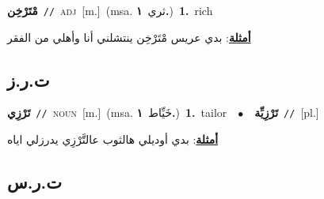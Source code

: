 \documentclass[10pt,a4paper,twoside]{article} %
\begin{document}
\begin{multicols}{2}
{{{{{\setlength\topsep{0pt}\textbf{\foreignlanguage{arabic}{مْتَرْخِن}}\ {\color{gray}\texttt{//}\color{black}}\ \textsc{adj}\ [m.]\ \color{gray}(msa. \foreignlanguage{arabic}{ثري}~\foreignlanguage{arabic}{\textbf{١.}})\color{black}\ \textbf{1.}~rich\  \begin{flushright}\color{gray}\foreignlanguage{arabic}{\textbf{\underline{\foreignlanguage{arabic}{أمثلة}}}: بدي عريس مْتَرْخِن ينتشلني أنا وأهلي من الفقر}\end{flushright}\color{black}} \vspace{2mm}

\vspace{-3mm}
\subsection*{\color{blue}\foreignlanguage{arabic}{ت.ر.ز}\color{blue}{}} 

{\setlength\topsep{0pt}\textbf{\foreignlanguage{arabic}{تَرْزِي}}\ {\color{gray}\texttt{//}\color{black}}\ \textsc{noun}\ [m.]\ \color{gray}(msa. \foreignlanguage{arabic}{خَيِّاط}~\foreignlanguage{arabic}{\textbf{١.}})\color{black}\ \textbf{1.}~tailor\ \ $\bullet$\ \ \setlength\topsep{0pt}\textbf{\foreignlanguage{arabic}{تَرْزِيِّة}}\ {\color{gray}\texttt{//}\color{black}}\ [pl.]\  \begin{flushright}\color{gray}\foreignlanguage{arabic}{\textbf{\underline{\foreignlanguage{arabic}{أمثلة}}}: بدي أوديلي هالثوب عالتَّرْزِي يدرزلي اياه}\end{flushright}\color{black}} \vspace{2mm}

\vspace{-3mm}
\subsection*{\color{blue}\foreignlanguage{arabic}{ت.ر.س}\color{blue}{}} 

}}}}
\end{multicols}
\end{document}
